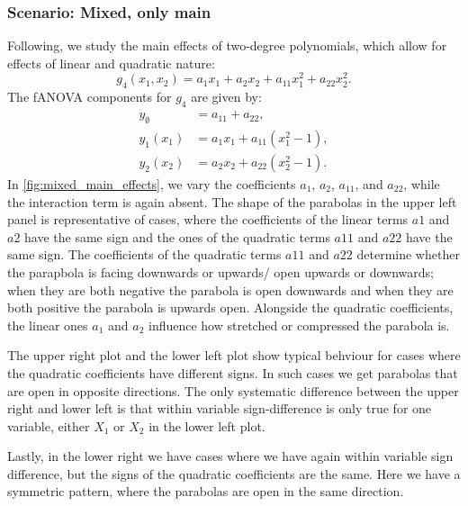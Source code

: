 \subsubsection*{Scenario: Mixed, only main}
Following, we study the main effects of two-degree polynomials, which allow for effects of linear and quadratic nature:
\[
g_4(x_1, x_2) = a_1 x_1 + a_2 x_2 + a_{11} x_1^2 + a_{22} x_2^2.
\]
The fANOVA components for $g_4$ are given by:
\begin{align*}
    y_{\emptyset} &= a_{11} + a_{22}, \\
    y_1(x_1) &= a_1 x_1 + a_{11}(x_1^2 - 1), \\
    y_2(x_2) &= a_2 x_2 + a_{22}(x_2^2 - 1).
\end{align*}
In \autoref{fig:mixed_main_effects}, we vary the coefficients $a_1$, $a_2$, $a_{11}$, and $a_{22}$, while the interaction term is again absent.
The shape of the parabolas in the upper left panel is representative of cases, where the coefficients of the linear terms $a1$ and $a2$ have the same sign and the ones of the quadratic terms $a11$ and $a22$ have the same sign.
The coefficients of the quadratic terms $a11$ and $a22$ determine whether the parapbola is facing downwards or upwards/ open upwards or downwards; when they are both negative the parabola is open downwards and when they are both positive the parabola is upwards open. Alongside the quadratic coefficients, the linear ones $a_1$ and $a_2$ influence how stretched or compressed the parabola is.\par
The upper right plot and the lower left plot show typical behviour for cases where the quadratic coefficients have different signs. In such cases we get parabolas that are open in opposite directions. The only systematic difference between the upper right and lower left is that within variable sign-difference is only true for one variable, either $X_1$ or $X_2$ in the lower left plot.\par
Lastly, in the lower right we have cases where we have again within variable sign difference, but the signs of the quadratic coefficients are the same. Here we have a symmetric pattern, where the parabolas are open in the same direction.

